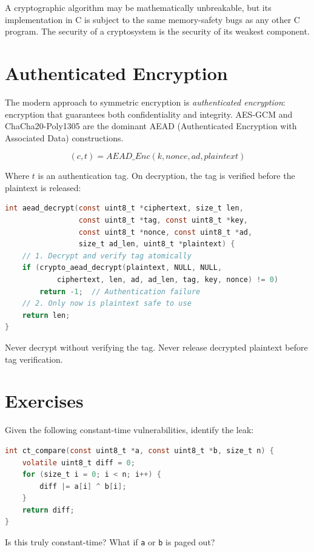 \begin{principle}
	A cryptographic algorithm may be mathematically unbreakable, but its implementation in C is subject to the same memory-safety bugs as any other C program. The security of a cryptosystem is the security of its weakest component.
\end{principle}

\section{Authenticated Encryption}

The modern approach to symmetric encryption is \emph{authenticated encryption}: encryption that guarantees both confidentiality and integrity. AES-GCM and ChaCha20-Poly1305 are the dominant AEAD (Authenticated Encryption with Associated Data) constructions.

\[
	(c, t) = AEAD\_Enc(k, nonce, ad, plaintext)
\]

Where \(t\) is an authentication tag. On decryption, the tag is verified before the plaintext is released:

\begin{lstlisting}[language=C, caption=AES-GCM decryption must verify tag]
int aead_decrypt(const uint8_t *ciphertext, size_t len,
                 const uint8_t *tag, const uint8_t *key,
                 const uint8_t *nonce, const uint8_t *ad,
                 size_t ad_len, uint8_t *plaintext) {
    // 1. Decrypt and verify tag atomically
    if (crypto_aead_decrypt(plaintext, NULL, NULL,
            ciphertext, len, ad, ad_len, tag, key, nonce) != 0)
        return -1;  // Authentication failure
    // 2. Only now is plaintext safe to use
    return len;
}
\end{lstlisting}

Never decrypt without verifying the tag. Never release decrypted plaintext before tag verification.

\section{Exercises}

\begin{exercise}
	Given the following constant-time vulnerabilities, identify the leak:
	\begin{lstlisting}[language=C]
int ct_compare(const uint8_t *a, const uint8_t *b, size_t n) {
    volatile uint8_t diff = 0;
    for (size_t i = 0; i < n; i++) {
        diff |= a[i] ^ b[i];
    }
    return diff;
}
	\end{lstlisting}
	Is this truly constant-time? What if \texttt{a} or \texttt{b} is paged out?
\end{exercise}

